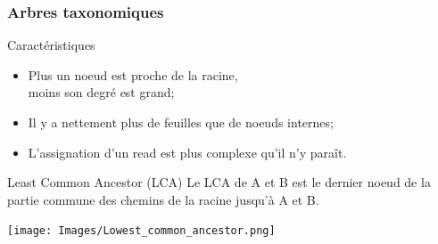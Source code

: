 \documentclass{beamer}
\begin{document}
\begin{frame}
\frametitle{Arbres taxonomiques}

\begin{block}{Caractéristiques}
\begin{itemize}
\item Plus un noeud est proche de la racine, \\moins son degré est grand;
\item Il y a nettement plus de feuilles que de noeuds internes;
\item L'assignation d'un \alert{read} est plus complexe qu'il n'y paraît.
\end{itemize}
\end{block}

\end{frame}

\begin{frame}

\begin{alertblock}{Least Common Ancestor (LCA)}
Le LCA de A et B est le dernier noeud de la partie commune des chemins de la racine jusqu'à A et B.
\end{alertblock}

\bigskip

\begin{center}
\texttt{[image: Images/Lowest\_common\_ancestor.png]}
\end{center}

\end{frame}
\end{document}
